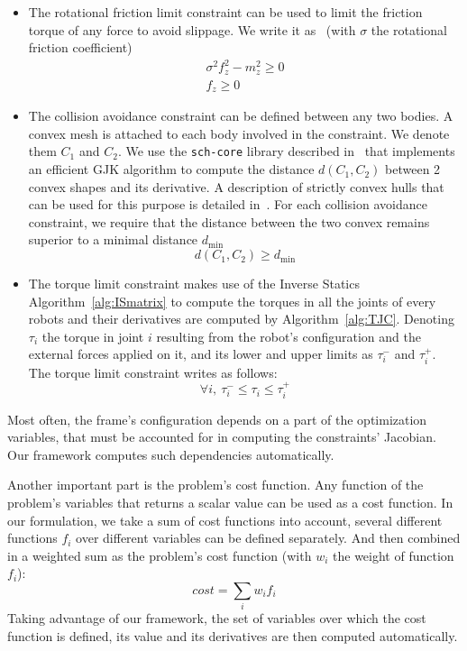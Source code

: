 \begin{itemize}
\item The rotational friction limit constraint can be used to limit the friction torque of any force to avoid slippage.
We write it as~ (with $\sigma$ the rotational friction coefficient)
\begin{equation}
  \begin{split}
    \sigma^2f_z^2-m_z^2 \geq 0 \\
    f_z \geq 0
  \end{split}
  \label{eq:frictionTorque}
\end{equation}


\item The collision avoidance constraint can be defined between any two bodies.
A convex mesh is attached to each body involved in the constraint.
We denote them $C_1$ and $C_2$.
We use the {\tt sch-core} library described in~\cite{benallegue:icra:2009} that implements an efficient GJK algorithm to compute the distance $d(C_1,C_2)$ between 2 convex shapes and its derivative.
A description of strictly convex hulls that can be used for this purpose is detailed in~\cite{escande:itro:2014}.
For each collision avoidance constraint, we require that the distance between the two convex remains superior to a minimal distance $d_{\min}$
\begin{equation}
  d(C_1, C_2)\geq d_{\min}
\end{equation}

\item The torque limit constraint makes use of the Inverse Statics Algorithm~\ref{alg:ISmatrix} to compute the torques in all the joints of every robots and their derivatives are computed by Algorithm~\ref{alg:TJC}.
Denoting $\tau_i$ the torque in joint $i$ resulting from the robot's configuration and the external forces applied on it, and its lower and upper limits as $\tau_i^-$ and $\tau_i^+$.
The torque limit constraint writes as follows:
\begin{equation}
  \forall i,\ \tau_i^- \leq \tau_i \leq \tau_i^+
\end{equation}
\end{itemize}


Most often, the frame's configuration depends on a part of the optimization variables, that must be accounted for in computing the constraints' Jacobian.
Our framework computes such dependencies automatically.

Another important part is the problem's cost function.
Any function of the problem's variables that returns a scalar value can be used as a cost function.
In our formulation, we take a sum of cost functions into account, several different functions $f_i$ over different variables can be defined separately.
And then combined in a weighted sum as the problem's cost function (with $w_i$ the weight of function $f_i$):
\begin{equation}
  cost = \sum\limits_i w_i f_i
\end{equation}
Taking advantage of our framework, the set of variables over which the cost function is defined, its value and its derivatives are then computed automatically.

